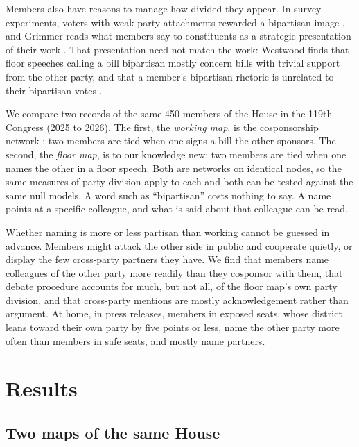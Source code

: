 \documentclass[9pt,twocolumn,twoside]{pnas-new}
\begin{document}
Members also have reasons to manage how divided they appear. In survey experiments, voters with weak party
attachments rewarded a bipartisan image \cite{harbridge2011}, and Grimmer reads what members say to constituents as a
strategic presentation of their work \cite{grimmer2013}. That presentation need not match the work: Westwood finds
that floor speeches calling a bill bipartisan mostly concern bills with trivial support from the other party, and
that a member's bipartisan rhetoric is unrelated to their bipartisan votes \cite{westwood2022}.

We compare two records of the same 450 members of the House in the 119th Congress (2025 to 2026). The first, the \emph{working map}, is the cosponsorship network \cite{fowler2006}: two members are tied when one
signs a bill the other sponsors. The second, the \emph{floor map}, is to our knowledge new: two members are tied when
one names the other in a floor speech. Both are networks on
identical nodes, so the same measures of party division apply to each and both can be tested against the same
null models. A word such as ``bipartisan'' costs nothing to say. A name points at a specific colleague, and what is
said about that colleague can be read.

Whether naming is more or less partisan than working cannot be guessed in advance. Members might attack the other
side in public and cooperate quietly, or display the few cross-party partners they have. We find that members name colleagues of the other party more readily than they cosponsor with them, that debate procedure accounts for much, but not all, of the\Parasplit
floor map's own party division, and that cross-party mentions are mostly acknowledgement rather than
argument. At home, in press releases, members
in exposed seats, whose district leans toward their own party by five points or less, name the other party more often
than members in safe seats, and mostly name partners.

\section*{Results}

\subsection*{Two maps of the same House}
\end{document}
